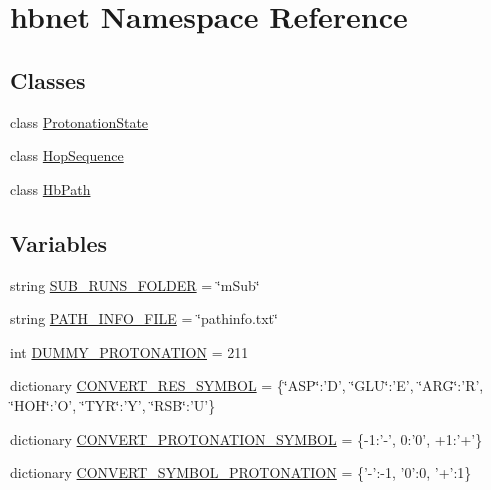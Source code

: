 \hypertarget{namespacehbnet}{\section{hbnet Namespace Reference}
\label{namespacehbnet}
}
\subsection*{Classes}
\begin{DoxyCompactItemize}
\item 
class \hyperlink{classhbnet_1_1_protonation_state}{Protonation\-State}
\item 
class \hyperlink{classhbnet_1_1_hop_sequence}{Hop\-Sequence}
\item 
class \hyperlink{classhbnet_1_1_hb_path}{Hb\-Path}
\end{DoxyCompactItemize}
\subsection*{Variables}
\begin{DoxyCompactItemize}
\item 
string \hyperlink{namespacehbnet_add488ebbd46a3a78639e26cd87fdc2b7}{S\-U\-B\-\_\-\-R\-U\-N\-S\-\_\-\-F\-O\-L\-D\-E\-R} = \char`\"{}m\-Sub\char`\"{}
\item 
string \hyperlink{namespacehbnet_aadb238781e56973ec548da8d15fb2ea2}{P\-A\-T\-H\-\_\-\-I\-N\-F\-O\-\_\-\-F\-I\-L\-E} = \char`\"{}pathinfo.\-txt\char`\"{}
\item 
int \hyperlink{namespacehbnet_a07b9db36ee4a7f2d45d097a1754db002}{D\-U\-M\-M\-Y\-\_\-\-P\-R\-O\-T\-O\-N\-A\-T\-I\-O\-N} = 211
\item 
dictionary \hyperlink{namespacehbnet_a0d8861c6c2d932730d1b9b4dbc70eac1}{C\-O\-N\-V\-E\-R\-T\-\_\-\-R\-E\-S\-\_\-\-S\-Y\-M\-B\-O\-L} = \{\char`\"{}A\-S\-P\char`\"{}\-:'D', \char`\"{}G\-L\-U\char`\"{}\-:'E', \char`\"{}A\-R\-G\char`\"{}\-:'R', \char`\"{}H\-O\-H\char`\"{}\-:'O', \char`\"{}T\-Y\-R\char`\"{}\-:'Y', \char`\"{}R\-S\-B\char`\"{}\-:'U'\}
\item 
dictionary \hyperlink{namespacehbnet_ac3023257190fab7487e80b8c767ce588}{C\-O\-N\-V\-E\-R\-T\-\_\-\-P\-R\-O\-T\-O\-N\-A\-T\-I\-O\-N\-\_\-\-S\-Y\-M\-B\-O\-L} = \{-\/1\-:'-\/', 0\-:'0', +1\-:'+'\}
\item 
dictionary \hyperlink{namespacehbnet_aef63b6d91d02552859d671f79a0fad17}{C\-O\-N\-V\-E\-R\-T\-\_\-\-S\-Y\-M\-B\-O\-L\-\_\-\-P\-R\-O\-T\-O\-N\-A\-T\-I\-O\-N} = \{'-\/'\-:-\/1, '0'\-:0, '+'\-:1\}
\end{DoxyCompactItemize}


